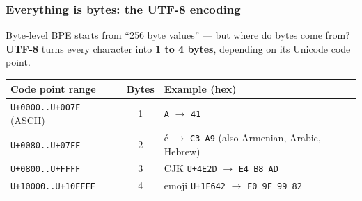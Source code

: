 \documentclass[aspectratio=169]{beamer}
\begin{document}
\begin{frame}
\frametitle{Everything is bytes: the UTF-8 encoding}
\vspace{-0.1cm}
{\small Byte-level BPE starts from ``256 byte values'' --- but where do bytes come from? \textbf{UTF-8} turns every character into \textbf{1 to 4 bytes}, depending on its Unicode code point.}

\vspace{0.25cm}
\begin{center}
{\small
\renewcommand{\arraystretch}{1.45}
\begin{tabular}{l c l}
  \textbf{Code point range} & \textbf{Bytes} & \textbf{Example (hex)}\\
  \hline
  \texttt{U+0000..U+007F} (ASCII) & 1 & \texttt{A} $\to$ \texttt{41}\\
  \texttt{U+0080..U+07FF} & 2 & \'e $\to$ \texttt{C3 A9} \; {\scriptsize (also Armenian, Arabic, Hebrew)}\\
  \texttt{U+0800..U+FFFF} & 3 & CJK \texttt{U+4E2D} $\to$ \texttt{E4 B8 AD}\\
  \texttt{U+10000..U+10FFFF} & 4 & emoji \texttt{U+1F642} $\to$ \texttt{F0 9F 99 82}\\
  \hline
\end{tabular}
}
\end{center}

\vspace{0.3cm}
\begin{center}
\end{center}
\end{frame}
\end{document}
